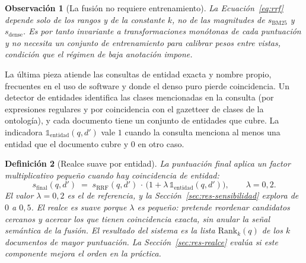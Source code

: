 \documentclass[11pt,letterpaper]{article}
\newtheorem{definition}{Definición}[section]
\newtheorem{observacion}[definition]{Observación}
\numberwithin{equation}{section}
\begin{document}
\begin{observacion}[La fusión no requiere entrenamiento]
La Ecuación~\eqref{eq:rrf} depende solo de los rangos y de la constante $k$, no de las magnitudes de $s_{\text{BM25}}$ y $s_{\text{dense}}$. Es por tanto invariante a transformaciones monótonas de cada puntuación y no necesita un conjunto de entrenamiento para calibrar pesos entre vistas, condición que el régimen de baja anotación impone.
\end{observacion}

La última pieza atiende las consultas de entidad exacta y nombre propio, frecuentes en el uso de software y donde el denso puro pierde coincidencia. Un detector de entidades identifica las clases mencionadas en la consulta (por expresiones regulares y por coincidencia con el gazetteer de clases de la ontología), y cada documento tiene un conjunto de entidades que cubre. La indicadora $\mathbb{1}_{\text{entidad}}(q, d')$ vale $1$ cuando la consulta menciona al menos una entidad que el documento cubre y $0$ en otro caso.

\begin{definition}[Realce suave por entidad]
\label{def:realce}
La puntuación final aplica un factor multiplicativo pequeño cuando hay coincidencia de entidad:
\begin{equation}
s_{\text{final}}(q, d') \;=\; s_{\text{RRF}}(q, d') \,\cdot\, \big(1 + \lambda\,\mathbb{1}_{\text{entidad}}(q, d')\big),
\qquad \lambda = 0{,}2.
\label{eq:final}
\end{equation}
El valor $\lambda=0{,}2$ es el de referencia, y la Sección~\ref{sec:res-sensibilidad} explora de $0$ a $0{,}5$. El realce es \emph{suave} porque $\lambda$ es pequeño: pretende reordenar candidatos cercanos y acercar los que tienen coincidencia exacta, sin anular la señal semántica de la fusión. El resultado del sistema es la lista $\mathrm{Rank}_k(q)$ de los $k$ documentos de mayor puntuación. La Sección~\ref{sec:res-realce} evalúa si este componente mejora el orden en la práctica.
\end{definition}
\end{document}
